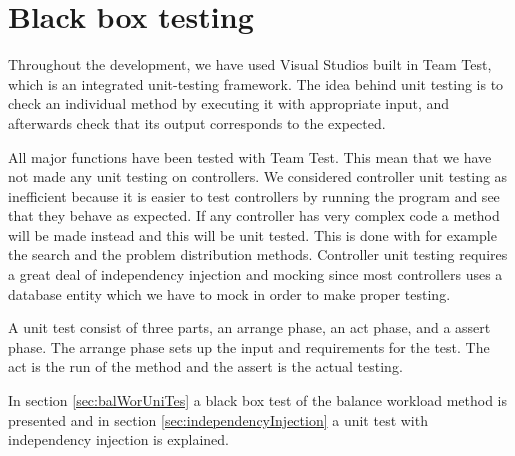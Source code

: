 \chapter{Black box testing}
\label{chap:testing}

Throughout the development, we have used Visual Studios built in Team Test, which is an integrated unit-testing framework. \cite{teamtest} 
The idea behind unit testing is to check an individual method by executing it with appropriate input, and afterwards check that its output corresponds to the expected.

All major functions have been tested with Team Test. This mean that we have not made any unit testing on controllers. We considered controller unit testing as inefficient because it is easier to test controllers by running the program and see that they behave as expected. If any controller has very complex code a method will be made instead and this will be unit tested. 
This is done with for example the search and the problem distribution methods. 
Controller unit testing requires a great deal of independency injection and mocking since most controllers uses a database entity which we have to mock in order to make proper testing. 

A unit test consist of three parts, an arrange phase, an act phase, and a assert phase. 
The arrange phase sets up the input and requirements for the test. 
The act is the run of the method and the assert is the actual testing.  

In section \ref{sec:balWorUniTes} a black box test of the balance workload method is presented and in section \ref{sec:independencyInjection} a unit test with independency injection is explained. 



